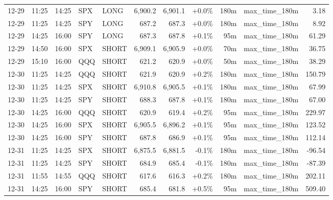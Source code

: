 \documentclass[11pt,a4paper,twoside]{article}
\begin{document}
\begin{center}
\begin{longtable}{>{\color{txtmain}}l l l l l r r r r >{\color{txtmain}}l r}
12-29 & 11:25 & 14:25 & SPX & LONG & 6,900.2 & 6,901.1 & \textcolor{wingreen}{+0.0\%} & 180m & max\_time\_180m & \textcolor{wingreen}{3.18} \\
12-29 & 11:25 & 14:25 & SPY & LONG & 687.2 & 687.3 & \textcolor{wingreen}{+0.0\%} & 180m & max\_time\_180m & \textcolor{wingreen}{8.92} \\
12-29 & 14:25 & 16:00 & SPY & LONG & 687.3 & 687.8 & \textcolor{wingreen}{+0.1\%} & 95m & max\_time\_180m & \textcolor{wingreen}{61.29} \\
12-29 & 14:50 & 16:00 & SPX & SHORT & 6,909.1 & 6,905.9 & \textcolor{wingreen}{+0.0\%} & 70m & max\_time\_180m & \textcolor{wingreen}{36.75} \\
12-29 & 15:10 & 16:00 & QQQ & SHORT & 621.2 & 620.9 & \textcolor{wingreen}{+0.0\%} & 50m & max\_time\_180m & \textcolor{wingreen}{38.29} \\
12-30 & 11:25 & 14:25 & QQQ & SHORT & 621.9 & 620.9 & \textcolor{wingreen}{+0.2\%} & 180m & max\_time\_180m & \textcolor{wingreen}{150.79} \\
12-30 & 11:25 & 14:25 & SPX & SHORT & 6,910.8 & 6,905.5 & \textcolor{wingreen}{+0.1\%} & 180m & max\_time\_180m & \textcolor{wingreen}{67.99} \\
12-30 & 11:25 & 14:25 & SPY & SHORT & 688.3 & 687.8 & \textcolor{wingreen}{+0.1\%} & 180m & max\_time\_180m & \textcolor{wingreen}{67.00} \\
12-30 & 14:25 & 16:00 & QQQ & SHORT & 620.9 & 619.4 & \textcolor{wingreen}{+0.2\%} & 95m & max\_time\_180m & \textcolor{wingreen}{229.97} \\
12-30 & 14:25 & 16:00 & SPX & SHORT & 6,905.5 & 6,896.2 & \textcolor{wingreen}{+0.1\%} & 95m & max\_time\_180m & \textcolor{wingreen}{123.52} \\
12-30 & 14:25 & 16:00 & SPY & SHORT & 687.8 & 686.9 & \textcolor{wingreen}{+0.1\%} & 95m & max\_time\_180m & \textcolor{wingreen}{112.14} \\
12-31 & 11:25 & 14:25 & SPX & SHORT & 6,875.5 & 6,881.5 & \textcolor{lossred}{-0.1\%} & 180m & max\_time\_180m & \textcolor{lossred}{-96.54} \\
12-31 & 11:25 & 14:25 & SPY & SHORT & 684.9 & 685.4 & \textcolor{lossred}{-0.1\%} & 180m & max\_time\_180m & \textcolor{lossred}{-87.39} \\
12-31 & 11:55 & 14:55 & QQQ & SHORT & 617.6 & 616.3 & \textcolor{wingreen}{+0.2\%} & 180m & max\_time\_180m & \textcolor{wingreen}{202.11} \\
12-31 & 14:25 & 16:00 & SPY & SHORT & 685.4 & 681.8 & \textcolor{wingreen}{+0.5\%} & 95m & max\_time\_180m & \textcolor{wingreen}{509.40} \\

\end{longtable}
\end{center}
\end{document}

